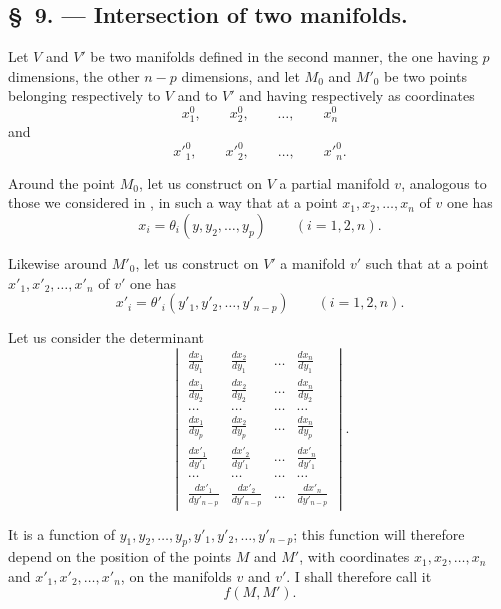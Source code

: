 \documentclass{article}
\begin{document}
\subsection*{\S~9. --- Intersection of two manifolds.}

Let $V$ and $V'$ be two manifolds defined in the second manner, the one having $p$ dimensions, the other $n-p$ dimensions, and let $M_{0}$ and $M'_{0}$ be two points belonging respectively to $V$ and to $V'$ and having respectively as coordinates
\[
x^{0}_{1}, \qquad x^{0}_{2}, \qquad \ldots, \qquad x^{0}_{n}
\]
and
\[
x'^{0}_{1}, \qquad x'^{0}_{2}, \qquad \ldots, \qquad x'^{0}_{n}.
\]

Around the point $M_{0}$, let us construct on $V$ a partial manifold $v$, analogous to those we considered in , in such a way that at a point $x_{1}, x_{2}, \ldots, x_{n}$ of $v$ one has
\[
x_{i} = \theta_{i}(y, y_{2}, \ldots, y_{p}) \qquad (i = 1, 2, n).
\]

Likewise around $M'_{0}$, let us construct on $V'$ a manifold $v'$ such that at a point $x'_{1}, x'_{2}, \ldots, x'_{n}$ of $v'$ one has
\[
x'_{i} = \theta'_{i}(y'_{1}, y'_{2}, \ldots, y'_{n-p}) \qquad (i = 1, 2, n).
\]

Let us consider the determinant
\[
\begin{vmatrix}
\frac{dx_{1}}{dy_{1}} & \frac{dx_{2}}{dy_{1}} & \ldots & \frac{dx_{n}}{dy_{1}} \\[1ex]
\frac{dx_{1}}{dy_{2}} & \frac{dx_{2}}{dy_{2}} & \ldots & \frac{dx_{n}}{dy_{2}} \\[1ex]
\ldots & \ldots & \ldots & \ldots \\[1ex]
\frac{dx_{1}}{dy_{p}} & \frac{dx_{2}}{dy_{p}} & \ldots & \frac{dx_{n}}{dy_{p}} \\[1ex]
\frac{dx'_{1}}{dy'_{1}} & \frac{dx'_{2}}{dy'_{1}} & \ldots & \frac{dx'_{n}}{dy'_{1}} \\[1ex]
\ldots & \ldots & \ldots & \ldots \\[1ex]
\frac{dx'_{1}}{dy'_{n-p}} & \frac{dx'_{2}}{dy'_{n-p}} & \ldots & \frac{dx'_{n}}{dy'_{n-p}}
\end{vmatrix}.
\]

It is a function of $y_{1}, y_{2}, \ldots, y_{p}, y'_{1}, y'_{2}, \ldots, y'_{n-p}$; this function will therefore depend on the position of the points $M$ and $M'$, with coordinates $x_{1}, x_{2}, \ldots, x_{n}$ and $x'_{1}, x'_{2}, \ldots, x'_{n}$, on the manifolds $v$ and $v'$. I shall therefore call it
\[
f(M, M').
\]
\end{document}
